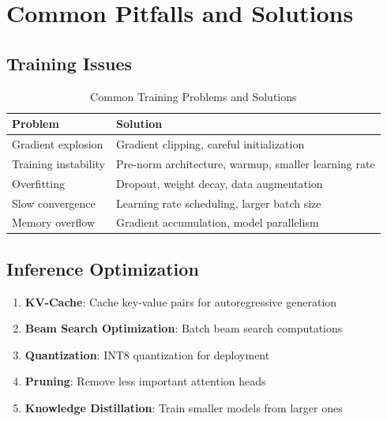 
\section{Common Pitfalls and Solutions}

\subsection{Training Issues}

\begin{table}[H]
\centering
\caption{Common Training Problems and Solutions}
\begin{tabular}{l l}
\toprule
\textbf{Problem} & \textbf{Solution} \\
\midrule
Gradient explosion & Gradient clipping, careful initialization \\
Training instability & Pre-norm architecture, warmup, smaller learning rate \\
Overfitting & Dropout, weight decay, data augmentation \\
Slow convergence & Learning rate scheduling, larger batch size \\
Memory overflow & Gradient accumulation, model parallelism \\
\bottomrule
\end{tabular}
\end{table}

\subsection{Inference Optimization}

\begin{enumerate}
    \item \textbf{KV-Cache}: Cache key-value pairs for autoregressive generation
    \item \textbf{Beam Search Optimization}: Batch beam search computations
    \item \textbf{Quantization}: INT8 quantization for deployment
    \item \textbf{Pruning}: Remove less important attention heads
    \item \textbf{Knowledge Distillation}: Train smaller models from larger ones
\end{enumerate}

